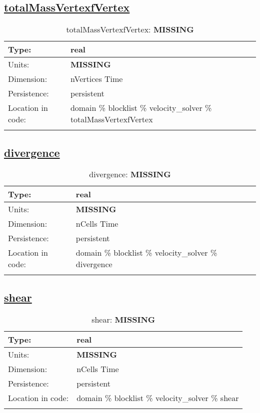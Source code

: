 \subsection[totalMassVertexfVertex]{\hyperref[sec:var_tab_velocity_solver]{totalMassVertexfVertex}}
\label{subsec:var_sec_velocity_solver_totalMassVertexfVertex}
\begin{center}
\begin{longtable}{| p{2.0in} | p{4.0in} |}
        \hline 
        Type: & real \\
        \hline 
        Units: & {\bf \color{red} MISSING} \\
        \hline 
        Dimension: & nVertices Time \\
        \hline 
        Persistence: & persistent \\
        \hline 
         Location in code: & domain \% blocklist \% velocity\_solver \% totalMassVertexfVertex \\
         \hline 
    \caption{totalMassVertexfVertex: {\bf \color{red} MISSING}}
\end{longtable}
\end{center}
\subsection[divergence]{\hyperref[sec:var_tab_velocity_solver]{divergence}}
\label{subsec:var_sec_velocity_solver_divergence}
\begin{center}
\begin{longtable}{| p{2.0in} | p{4.0in} |}
        \hline 
        Type: & real \\
        \hline 
        Units: & {\bf \color{red} MISSING} \\
        \hline 
        Dimension: & nCells Time \\
        \hline 
        Persistence: & persistent \\
        \hline 
         Location in code: & domain \% blocklist \% velocity\_solver \% divergence \\
         \hline 
    \caption{divergence: {\bf \color{red} MISSING}}
\end{longtable}
\end{center}
\subsection[shear]{\hyperref[sec:var_tab_velocity_solver]{shear}}
\label{subsec:var_sec_velocity_solver_shear}
\begin{center}
\begin{longtable}{| p{2.0in} | p{4.0in} |}
        \hline 
        Type: & real \\
        \hline 
        Units: & {\bf \color{red} MISSING} \\
        \hline 
        Dimension: & nCells Time \\
        \hline 
        Persistence: & persistent \\
        \hline 
         Location in code: & domain \% blocklist \% velocity\_solver \% shear \\
         \hline 
    \caption{shear: {\bf \color{red} MISSING}}
\end{longtable}
\end{center}
